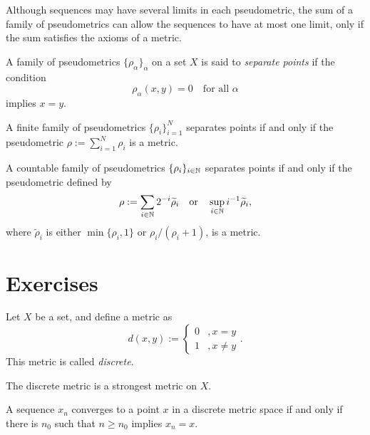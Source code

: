 \documentclass{../note}
\begin{document}
Although sequences may have several limits in each pseudometric, the sum of a family of pseudometrics can allow the sequences to have at most one limit, only if the sum satisfies the axioms of a metric.

\begin{defn}
A family of pseudometrics $\{\rho_\alpha\}_\alpha$ on a set $X$ is said to \emph{separate points} if the condition 
\[\rho_\alpha(x,y)=0\quad\text{for all $\alpha$}\]
implies $x=y$.
\end{defn}
\begin{prop}
\begin{parts}
\item
A finite family of pseudometrics $\{\rho_i\}_{i=1}^N$ separates points if and only if the pseudometric $\rho:=\sum_{i=1}^N\rho_i$ is a metric.
\item
A countable family of pseudometrics $\{\rho_i\}_{i\in\mathbb{N}}$ separates points if and only if the pseudometric defined by
\[\rho:=\sum_{i\in\mathbb{N}}2^{-i}\widetilde\rho_i\quad\text{or}\quad\sup_{i\in\mathbb{N}}i^{-1}\widetilde\rho_i,\]
where $\tilde\rho_i$ is either $\min\{\rho_i,1\}$ or $\rho_i/(\rho_i+1)$, is a metric.
\end{parts}
\end{prop}

\section*{Exercises}

\begin{prb}
Let $X$ be a set, and define a metric as
\[d(x,y):=\begin{cases}0&,x=y\\1&,x\ne y\end{cases}.\]
This metric is called \emph{discrete}.
\begin{parts}
\item
The discrete metric is a strongest metric on $X$.
\item 
\item
A sequence $x_n$ converges to a point $x$ in a discrete metric space if and only if there is $n_0$ such that $n\ge n_0$ implies $x_n=x$.
\end{parts}
\end{prb}
\end{document}
